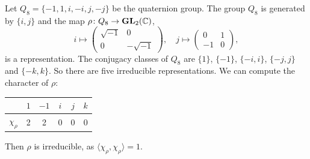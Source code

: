 \begin{example}



\end{example}

\begin{example}
    Let $Q_8=\{-1,1,i,-i,j,-j\}$ be the quaternion group. 
    The group $Q_8$ is generated by $\{i,j\}$ and the map $\rho\colon Q_8\to\mathbf{GL}_2(\mathbb{C})$, 
    \[
    i\mapsto\begin{pmatrix}
    \sqrt{-1}&0\\0&-\sqrt{-1}
    \end{pmatrix},
    \quad
    j\mapsto\begin{pmatrix}
    0&1\\-1&0
    \end{pmatrix},
    \]
    is a representation.
    The conjugacy classes of $Q_8$ are $\{1\}$, $\{-1\}$, $\{-i,i\}$, $\{-j,j\}$ and $\{-k,k\}$. 
    So there are five irreducible representations. 
    We can compute the character of $\rho$:
    	\begin{center}
		\begin{tabular}{|c|c|c|c|c|c|}
		    \hline
			& $1$ & $-1$ & $i$ & $j$ & $k$\tabularnewline
			\hline
			$\chi_\rho$ & 2 & 2 & 0 & 0 & 0\tabularnewline
			\hline
		\end{tabular}
	\end{center}
	Then $\rho$ is irreducible, as $\langle\chi_\rho,\chi_\rho\rangle=1$. 
	

\end{example}
